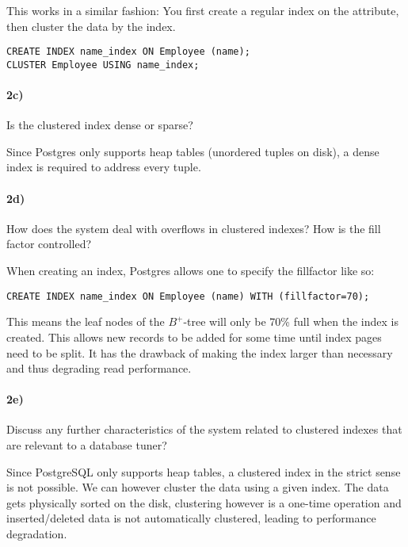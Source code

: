 \documentclass[11pt]{scrartcl}
\begin{document}
\vspace{1em}
This works in a similar fashion: You first create a regular index
on the attribute, then cluster the data by the index.

{\small
\begin{verbatim}
CREATE INDEX name_index ON Employee (name);
CLUSTER Employee USING name_index;
\end{verbatim}
}

\paragraph{2c)} Is the clustered index dense or sparse?

\vspace{1em}
Since Postgres only supports heap
tables (unordered tuples on disk), a dense index is required to address
every tuple.

\paragraph{2d)} How does the system deal with overflows in clustered indexes?
How is the fill factor controlled?

\vspace{1em}
When creating an index, Postgres allows one to specify the fillfactor like so:

{\small
\begin{verbatim}
CREATE INDEX name_index ON Employee (name) WITH (fillfactor=70);
\end{verbatim}
}

This means the leaf nodes of the $B^+$-tree will only be 70\% full
when the index is created. This allows new records to be added for some time
until index pages need to be split. It has the drawback of making the index
larger than necessary and thus degrading read performance.

\paragraph{2e)} Discuss any further characteristics of the system
related to clustered indexes that are relevant to a database
tuner?

\smallskip

\vspace{1em}
Since PostgreSQL only supports heap tables, a clustered index in the strict sense
is not possible. We can however cluster the data using a given index. The data
gets physically sorted on the disk, clustering however is a one-time operation
and inserted/deleted data is not automatically clustered, leading to performance
degradation.\\
\end{document}
